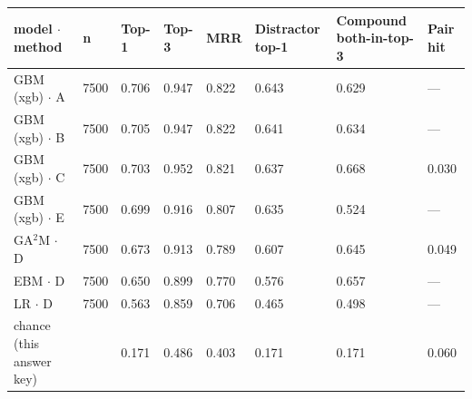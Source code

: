 \begin{tabular}{llllllll}
\hline
model $\cdot$ method & n & Top-1 & Top-3 & MRR & Distractor top-1 & Compound both-in-top-3 & Pair hit \\
\hline
GBM (xgb) $\cdot$ A & 7500 & 0.706 & 0.947 & 0.822 & 0.643 & 0.629 & --- \\
GBM (xgb) $\cdot$ B & 7500 & 0.705 & 0.947 & 0.822 & 0.641 & 0.634 & --- \\
GBM (xgb) $\cdot$ C & 7500 & 0.703 & 0.952 & 0.821 & 0.637 & 0.668 & 0.030 \\
GBM (xgb) $\cdot$ E & 7500 & 0.699 & 0.916 & 0.807 & 0.635 & 0.524 & --- \\
GA$^2$M $\cdot$ D & 7500 & 0.673 & 0.913 & 0.789 & 0.607 & 0.645 & 0.049 \\
EBM $\cdot$ D & 7500 & 0.650 & 0.899 & 0.770 & 0.576 & 0.657 & --- \\
LR $\cdot$ D & 7500 & 0.563 & 0.859 & 0.706 & 0.465 & 0.498 & --- \\
chance (this answer key) &  & 0.171 & 0.486 & 0.403 & 0.171 & 0.171 & 0.060 \\
\hline
\end{tabular}
